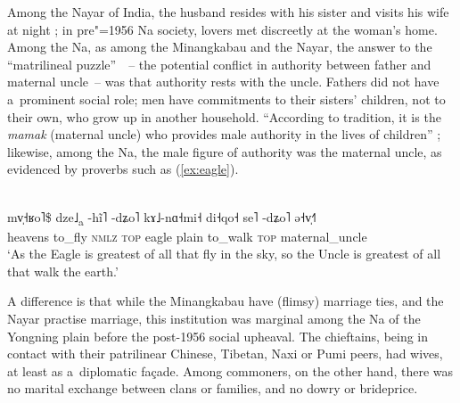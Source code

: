 {\noindent}Among the Nayar of India, the husband resides with his sister and visits his wife at night \citep{fuller1976}; in pre"=1956 Na society, lovers met discreetly at the woman’s home. Among the Na, as among the Minangkabau and the Nayar, the answer to the “matrilineal puzzle”~\citep{richards1950}~-- the potential conflict in authority between father and maternal uncle~-- was that authority rests with the uncle. Fathers did not have a~prominent social role; men have commitments to their sisters' children, not to their own, who grow up in another household. “According to tradition, it is the \textit{mamak} (maternal uncle) who provides male authority in the lives of children” \citep[6]{hadler2008}; likewise, among the Na, the male figure of authority was the maternal uncle, as evidenced by proverbs such as (\ref{ex:eagle}).

\begin{exe}
	\ex
	\label{ex:eagle}
	\\
	\gll mv̩˧ʁo˥\$	dze˩\textsubscript{a}	-hĩ˥	-dʑo˥	kɤ˩-nɑ˧mi˧	di˧qo˧	se˥	-dʑo˥	ə˧v̩˧˥\\
	heavens		to\_fly		\textsc{nmlz}	\textsc{top}	eagle	plain	to\_walk		\textsc{top}		maternal\_uncle\\
	\glt ‘As the Eagle is greatest of all that fly in the sky, so the Uncle is greatest of all that walk the earth.'
\end{exe}

{\noindent}A difference is that while the Minangkabau have (flimsy) marriage ties, and the Nayar practise marriage, this institution was marginal among the Na of the Yongning plain before the post-1956 social upheaval. The chieftains, being in contact with their patrilinear Chinese, {Tibetan}, {Naxi} or {Pumi} peers, had wives, at least as a~diplomatic façade. Among commoners, on the other hand, there was no marital exchange between clans or families, and no dowry or brideprice. 

